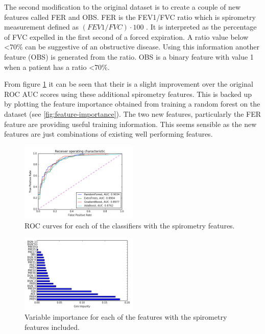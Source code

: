 \documentclass[journal]{IEEEtran}
\begin{document}
The second modification to the original dataset is to create a couple of new features called FER and OBS. FER is the FEV1/FVC ratio which is spirometry measurement defined as $(FEV1/FVC) \cdot 100$ \cite{patient2016spirometry}. It is interpreted as the percentage of FVC expelled in the first second of a forced expiration. A ratio value below <70\% can be suggestive of an obstructive disease. Using this information another feature (OBS) is generated from the ratio. OBS is a binary feature with value 1 when a patient has a ratio <70\%.

From figure \ref{fig:roc-spiro-features} it can be seen that their is a slight improvement over the original ROC AUC scores using these additional spirometry features. This is backed up by plotting the feature importance obtained from training a random forest on the dataset (see \ref{fig:feature-importance}). The two new features, particularly the FER feature are providing useful training information. This seems sensible as the new features are just combinations of existing well performing features.

\begin{figure}[!t]
\centering
\includegraphics[width=0.5\textwidth]{../src/img/roc_spiro_features.png}
\caption{ROC curves for each of the classifiers with the spirometry features.}
\label{fig:roc-spiro-features}
\end{figure}

\begin{figure}[!t]
\centering
\includegraphics[width=0.5\textwidth]{../src/img/importance_spiro_features.png}
\caption{Variable importance for each of the features with the spirometry features included.}
\label{fig:importance-spiro-features}
\end{figure}
\end{document}
